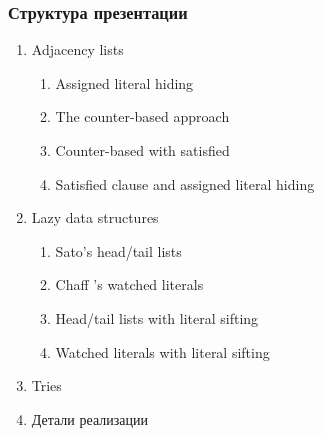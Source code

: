 \documentclass[aspectratio=169,xcolor=table,english]{beamer}
\begin{document}
\begin{frame}[fragile] \frametitle{Структура презентации}
    \begin{enumerate}
        \item Adjacency lists
        \begin{enumerate}
            \item Assigned literal hiding
            \item The counter-based approach
            \item Counter-based with satisfied
            \item Satisfied clause and assigned literal hiding
        \end{enumerate}
        \item Lazy data structures
        \begin{enumerate}
            \item Sato’s head/tail lists
            \item Chaff ’s watched literals
            \item Head/tail lists with literal sifting
            \item Watched literals with literal sifting
        \end{enumerate}
        \item Tries
        \item Детали реализации
    \end{enumerate}
\end{frame}
\end{document}
